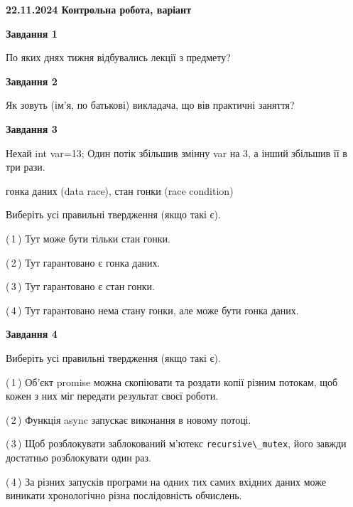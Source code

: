 \documentclass[12pt, ukrainian]{article}
\def\code#1{\Verb!#1!}
\begin{document}
\begin {large}

\textbf{22.11.2024 Контрольна робота, варіант  }\par


{

\begin{center}
\textbf{Завдання 1}
\end{center}

По яких днях тижня відбувались лекції з предмету?


\begin{center}
\textbf{Завдання 2}
\end{center}

Як зовуть (ім'я, по батькові) викладача, що вів практичні заняття?


\begin{center}
\textbf{Завдання 3}
\end{center}

Нехай int var=13; Один потік збільшив змінну var на 3, а інший збільшив її в три рази.

гонка даних (data race), стан гонки (race condition)

Виберіть усі правильні твердження (якщо такі є).\par
\vspace{2mm}
(\,1\,) Тут може бути тільки стан гонки.%

(\,2\,) Тут гарантовано є гонка даних.%

(\,3\,) Тут гарантовано є стан гонки.%

(\,4\,) Тут гарантовано нема стану гонки, але може бути гонка даних.%


\begin{center}
\textbf{Завдання 4}
\end{center}

Виберіть усі правильні твердження (якщо такі є).\par
\vspace{2mm}

(\,1\,) Об’єкт promise можна скопіювати та роздати копії різним потокам, щоб кожен з них міг передати результат своєї роботи.%

(\,2\,) Функція async запускає виконання в новому потоці.%

(\,3\,) Щоб розблокувати заблокований м’ютекс \code{recursive\_mutex}, його завжди достатньо розблокувати один раз.%

(\,4\,) За різних запусків програми на одних тих самих вхідних даних може виникати хронологічно різна послідовність обчислень.%


}
\end{large}
\end{document}
